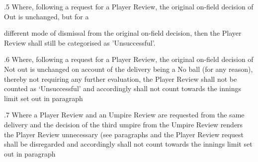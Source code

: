 \documentclass[12pt]{article}
\begin{document}
\vspace{\baselineskip}
{\fontsize{9pt}{10.8pt}.5 \tabto{0.49in} Where, following a request for a Player Review, the original on-field decision of Out is unchanged, but for a\par}\par


\vspace{\baselineskip}
\begin{adjustwidth}{0.5in}{0.69in}
{\fontsize{9pt}{10.8pt}\selectfont different mode of dismissal from the original on-field decision, then the Player Review shall still be categorised as ’Unsuccessful’.\par}\par

\end{adjustwidth}


\vspace{\baselineskip}
\begin{adjustwidth}{0.5in}{0.26in}
{\fontsize{9pt}{10.8pt}.6 \tabto{0.49in} Where, following a request for a Player Review, the original on-field decision of Not out is unchanged on account of the delivery being a No ball (for any reason), thereby not requiring any further evaluation, the Player Review shall not be counted as ‘Unsuccessful’ and accordingly shall not count towards the innings limit set out in paragraph \par}\par

\end{adjustwidth}


\vspace{\baselineskip}
\begin{adjustwidth}{0.5in}{0.1in}
{\fontsize{9pt}{10.8pt}.7 \tabto{0.49in} Where a Player Review and an Umpire Review are requested from the same delivery and the decision of the third umpire from the Umpire Review renders the Player Review unnecessary (see paragraphs and the Player Review request shall be disregarded and accordingly shall not count towards the innings limit set out in paragraph \par}\par

\end{adjustwidth}
\end{document}
